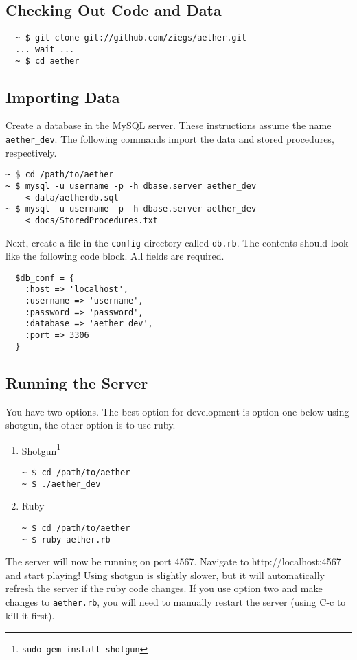 \subsection{Checking Out Code and Data}
\begin{verbatim}
  ~ $ git clone git://github.com/ziegs/aether.git
  ... wait ...
  ~ $ cd aether
\end{verbatim}

\subsection{Importing Data}
Create a database in the MySQL server. These instructions assume the name \verb!aether_dev!. The following commands import the data and stored procedures, respectively.
\begin{verbatim}
~ $ cd /path/to/aether
~ $ mysql -u username -p -h dbase.server aether_dev 
    < data/aetherdb.sql
~ $ mysql -u username -p -h dbase.server aether_dev
    < docs/StoredProcedures.txt
\end{verbatim}
Next, create a file in the \verb!config! directory called \verb!db.rb!. The contents should look like the following code block. All fields are required.
\begin{verbatim}
  $db_conf = {
    :host => 'localhost',
    :username => 'username',
    :password => 'password',
    :database => 'aether_dev',
    :port => 3306
  }
\end{verbatim}

\subsection{Running the Server}
You have two options. The best option for development is option one below using shotgun, the other option is to use ruby.
\begin{enumerate}
  \item Shotgun\footnote{{\tt sudo gem install shotgun}}
  \begin{verbatim}
~ $ cd /path/to/aether
~ $ ./aether_dev
  \end{verbatim} 
  \item Ruby
  \begin{verbatim}
~ $ cd /path/to/aether
~ $ ruby aether.rb
  \end{verbatim}
\end{enumerate}
The server will now be running on port 4567. Navigate to http://localhost:4567 and start playing! Using shotgun is slightly slower, but it will automatically refresh the server if the ruby code changes. If you use option two and make changes to \verb!aether.rb!, you will need to manually restart the server (using C-c to kill it first).

